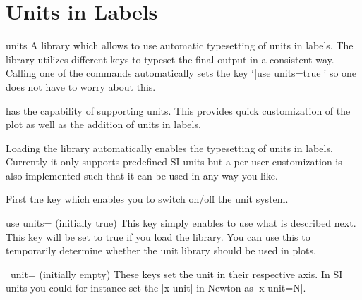 
\section{Units in Labels}
\label{sec:units}

\begingroup
\def\pgfplotsmanualcurlibrary{units}

{}

\begin{pgfplotslibrary}{units}
    A library which allows to use automatic typesetting of units in labels. The
    library utilizes different keys to typeset the final output in a consistent
    way. Calling one of the commands automatically sets the key
    `|use units=true|' so one does not have to worry about this.
\end{pgfplotslibrary}

\PGFPlots{} has the capability of supporting units. This provides quick
customization of the plot as well as the addition of units in labels.

Loading the library automatically enables the typesetting of units in labels.
Currently it only supports predefined SI units but a per-user customization is
also implemented such that it can be used in any way you like.

First the key which enables you to switch on/off the unit system.

\begin{pgfplotskey}{use units= (initially true)}
    This key simply enables \PGFPlots{} to use what is described next. This key
    will be set to true if you load the library. You can use this to
    temporarily determine whether the unit library should be used in plots.
\end{pgfplotskey}

\begin{pgfplotsxykey}{\x\ unit= (initially empty)}
    These keys set the unit in their respective axis. In SI units you could for
    instance set the |x unit| in Newton as |x unit=N|.
\end{pgfplotsxykey}

